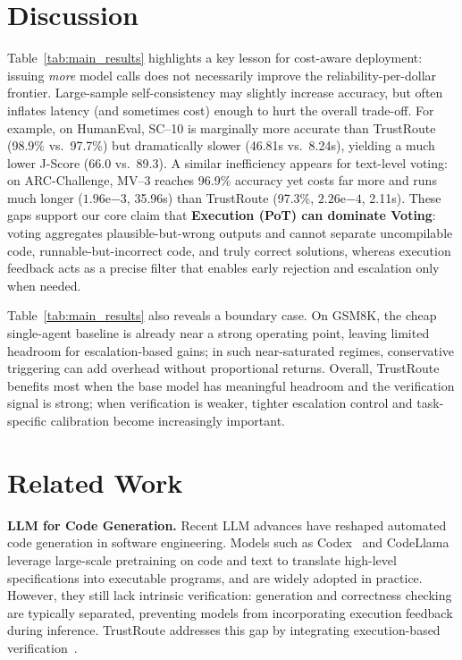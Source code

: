 \documentclass[acmsmall,screen,review,anonymous]{acmart}
\begin{document}
\section{Discussion}
\label{sec:discussion}

Table~\ref{tab:main_results} highlights a key lesson for cost-aware deployment: issuing \emph{more} model calls does not necessarily
improve the reliability-per-dollar frontier. Large-sample self-consistency may slightly increase accuracy, but often inflates latency
(and sometimes cost) enough to hurt the overall trade-off. For example, on HumanEval, SC--10 is marginally more accurate than TrustRoute
(98.9\% vs.\ 97.7\%) but dramatically slower (46.81s vs.\ 8.24s), yielding a much lower J-Score (66.0 vs.\ 89.3).
A similar inefficiency appears for text-level voting: on ARC-Challenge, MV--3 reaches 96.9\% accuracy yet costs far more and runs much longer
($1.96\mathrm{e}{-3}$, 35.96s) than TrustRoute (97.3\%, $2.26\mathrm{e}{-4}$, 2.11s).
These gaps support our core claim that \textbf{Execution (PoT) can dominate Voting}: voting aggregates plausible-but-wrong outputs and
cannot separate uncompilable code, runnable-but-incorrect code, and truly correct solutions, whereas execution feedback acts as a precise
filter that enables early rejection and escalation only when needed.

Table~\ref{tab:main_results} also reveals a boundary case. On GSM8K, the cheap single-agent baseline is already near a strong operating
point, leaving limited headroom for escalation-based gains; in such near-saturated regimes, conservative triggering can add overhead without
proportional returns. Overall, TrustRoute benefits most when the base model has meaningful headroom and the verification signal is strong;
when verification is weaker, tighter escalation control and task-specific calibration become increasingly important.



\section{Related Work}

\textbf{LLM for Code Generation.} Recent LLM advances have reshaped automated code generation in software engineering.
Models such as Codex~\cite{chen2021codex} and CodeLlama~\cite{roziere2023codellama} leverage large-scale pretraining on code and text
to translate high-level specifications into executable programs, and are widely adopted in practice. However, they still lack intrinsic
verification: generation and correctness checking are typically separated, preventing models from incorporating execution feedback during
inference. TrustRoute addresses this gap by integrating execution-based verification~\cite{gao2022pal}.
\end{document}
